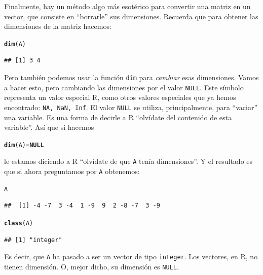 \documentclass[10pt,a4paper]{article}\usepackage[]{graphicx}\usepackage[]{color}
\makeatletter
\newcommand{\hlstd}[1]{\textcolor[rgb]{0.345,0.345,0.345}{#1}}%
\newcommand{\hlkwa}[1]{\textcolor[rgb]{0.161,0.373,0.58}{\textbf{#1}}}%
\newcommand{\hlkwb}[1]{\textcolor[rgb]{0.69,0.353,0.396}{#1}}%
\newcommand{\hlkwd}[1]{\textcolor[rgb]{0.737,0.353,0.396}{\textbf{#1}}}%
\newenvironment{kframe}{%
 \def\at@end@of@kframe{}%
 \ifinner\ifhmode%
  \def\at@end@of@kframe{\end{minipage}}%
  \begin{minipage}{\columnwidth}%
 \fi\fi%
 \def\FrameCommand##1{\hskip\@totalleftmargin \hskip-\fboxsep
 \colorbox{shadecolor}{##1}\hskip-\fboxsep
     \hskip-\linewidth \hskip-\@totalleftmargin \hskip\columnwidth}%
 \MakeFramed {\advance\hsize-\width
   \@totalleftmargin\z@ \linewidth\hsize
   \@setminipage}}%
 {\par\unskip\endMakeFramed%
 \at@end@of@kframe}
\newenvironment{knitrout}{}{} %
\newcounter {cont01}
\makeatother
\begin{document}
Finalmente, hay un método algo más esotérico para convertir una matriz en un vector, que consiste en ``borrarle'' sus dimensiones. Recuerda que para obtener las dimensiones de la matriz hacemos:
\begin{knitrout}
\color{fgcolor}\begin{kframe}
\begin{alltt}
\hlkwd{dim}\hlstd{(A)}
\end{alltt}
\begin{verbatim}
## [1] 3 4
\end{verbatim}
\end{kframe}
\end{knitrout}
     Pero también podemos usar la función {\tt dim} para {\em cambiar} esas dimensiones. Vamos a hacer esto, pero cambiando las dimensiones por el valor {\tt NULL}. Este símbolo representa un valor especial R, como otros valores especiales que ya hemos encontrado: {\tt NA, NaN, Inf}. El valor {\tt NULL} se utiliza, principalmente, para ``vaciar'' una variable. Es una forma de decirle a R ``olvídate del contenido de esta variable''. Así que si hacemos
\begin{knitrout}
\color{fgcolor}\begin{kframe}
\begin{alltt}
     \hlkwd{dim}\hlstd{(A)} \hlkwb{=} \hlkwa{NULL}
\end{alltt}
\end{kframe}
\end{knitrout}
     le estamos diciendo a R ``olvídate de que {\tt A} tenía dimensiones''. Y el resultado es que si ahora preguntamos por {\tt A} obtenemos:
\begin{knitrout}
\color{fgcolor}\begin{kframe}
\begin{alltt}
\hlstd{A}
\end{alltt}
\begin{verbatim}
##  [1] -4 -7  3 -4  1 -9  9  2 -8 -7  3 -9
\end{verbatim}
\begin{alltt}
\hlkwd{class}\hlstd{(A)}
\end{alltt}
\begin{verbatim}
## [1] "integer"
\end{verbatim}
\end{kframe}
\end{knitrout}
     Es decir, que {\tt A} ha pasado a ser un vector de tipo {\tt integer}. Los vectores, en R, no tienen dimensión. O,  mejor dicho, su dimensión es {\tt NULL}.
\end{document}
